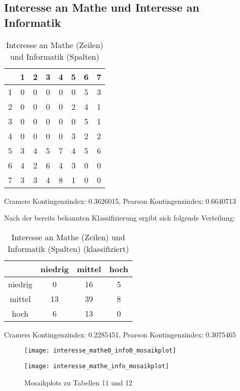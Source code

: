 \documentclass[paper=a4,                 %
               fontsize=12pt,            %
               parskip=half,             %
               ngerman,                 %
               ]{scrartcl}
\begin{document}
\newpage
\subsection{Interesse an Mathe und Interesse an Informatik}

\begin{table}[h]
\begin{center}
\begin{tabular}{c||c|c|c|c|c|c|c}
& 1 & 2 & 3 & 4 & 5 & 6 & 7 \\
\hline
  1 & 0& 0& 0& 0& 0& 5& 3\\
  2& 0& 0& 0& 0& 2& 4& 1\\
  3& 0& 0& 0& 0& 0& 5& 1\\
  4& 0& 0& 0& 0& 3& 2& 2\\
  5& 3& 4& 5& 7& 4& 5& 6\\
  6 &4 &2 &6 &4 &3 &0 &0\\
  7 &3& 3& 4& 8& 1& 0& 0\\
\end{tabular}
\caption{Interesse an Mathe (Zeilen) und Informatik (Spalten)}
Cramers Kontingenzindex:  0.3626015, Pearson Kontingenzindex:  0.6640713
\end{center}
\end{table}
Nach der bereits bekannten Klassifizierung ergibt sich folgende Verteilung:
\begin{table}[h]
\begin{center}
\begin{tabular}{c|c|c|c}
 & niedrig & mittel & hoch \\
 \hline
 niedrig      & 0   &  16 &   5\\
  mittel      & 13  &   39  &  8\\
  hoch    &   6 &    13 &   0\\
\end{tabular}
\caption{Interesse an Mathe (Zeilen) und Informatik (Spalten) (klassifiziert)}
Cramers Kontingenzindex:  0.2285451, Pearson Kontingenzindex:  0.3075465 
\end{center}
\end{table}

\begin{figure}[ht]
   \begin{minipage}{.4\textwidth}
      \texttt{[image: interesse\_mathe0\_info0\_mosaikplot]}
   \end{minipage}
   \hspace{.1\linewidth}%
   \begin{minipage}{.4\textwidth} %
	\texttt{[image: interesse\_mathe\_info\_mosaikplot]}
   \end{minipage}
   \caption{Mosaikplots zu Tabellen 11 und 12}
\end{figure}
\end{document}
